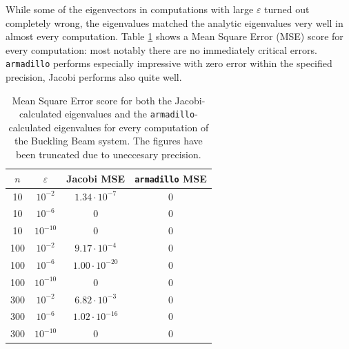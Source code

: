 \documentclass[reprint,english]{revtex4-1}
\begin{document}
While some of the eigenvectors in computations with large \(\varepsilon\) turned out completely wrong, the eigenvalues matched the analytic eigenvalues very well in almost every computation. Table \ref{tab:bucklingbeam_MSE} shows a Mean Square Error (MSE) score for every computation: most notably there are no immediately critical errors. \texttt{armadillo} performs especially impressive with zero error within the specified precision, Jacobi performs also quite well.
\begin{table}[h]
\centering
\caption{Mean Square Error score for both the Jacobi-calculated eigenvalues and the \texttt{armadillo}-calculated eigenvalues for every computation of the Buckling Beam system. The figures have been truncated due to uneccesary precision.}\label{tab:bucklingbeam_MSE}
\begin{tabular}{|c|c|c|c|}
\hline
\(n\) & \(\varepsilon\) & Jacobi MSE             & \texttt{armadillo} MSE \\\hline
10    & \(10^{-2}\)     & \(1.34\cdot10^{-7}\)   & 0                      \\\hline
10    & \(10^{-6}\)     &  0                     & 0                      \\\hline
10    & \(10^{-10}\)    &  0                     & 0                      \\\hline
100   & \(10^{-2}\)     &  \(9.17\cdot10^{-4}\)  & 0                      \\\hline
100   & \(10^{-6}\)     &  \(1.00\cdot10^{-20}\) & 0                      \\\hline
100   & \(10^{-10}\)    &  0                     & 0                      \\\hline
300   & \(10^{-2}\)     &  \(6.82\cdot10^{-3}\)  & 0                      \\\hline
300   & \(10^{-6}\)     &  \(1.02\cdot10^{-16}\) & 0                      \\\hline
300   & \(10^{-10}\)    &  0                     & 0                      \\\hline
\end{tabular}
\end{table}
\end{document}
